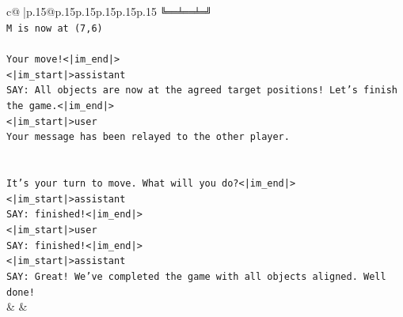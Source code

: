 \documentclass{article}
\begin{document}
{\begin{supertabular}{c@{$\;$}|p{.15\linewidth}@{}p{.15\linewidth}p{.15\linewidth}p{.15\linewidth}p{.15\linewidth}p{.15\linewidth}}
{{{\texttt{╚══╧══╧═╝} \\
\texttt{M is now at (7,6)} \\
\\ 
\texttt{Your move!<|im\_end|>} \\
\texttt{<|im\_start|>assistant} \\
\texttt{SAY: All objects are now at the agreed target positions! Let's finish the game.<|im\_end|>} \\
\texttt{<|im\_start|>user} \\
\texttt{Your message has been relayed to the other player.} \\
\\ 
\\ 
\texttt{It's your turn to move. What will you do?<|im\_end|>} \\
\texttt{<|im\_start|>assistant} \\
\texttt{SAY: finished!<|im\_end|>} \\
\texttt{<|im\_start|>user} \\
\texttt{SAY: finished!<|im\_end|>} \\
\texttt{<|im\_start|>assistant} \\
\texttt{SAY: Great! We've completed the game with all objects aligned. Well done!} \\
            }
        }
    }
    & & \\ \\


\end{supertabular}}
\end{document}
